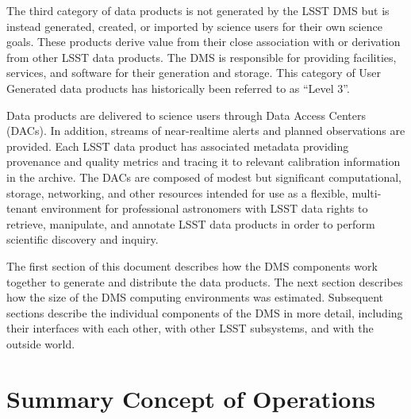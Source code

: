 \documentclass[DM,toc]{lsstdoc}
\begin{document}
The third category of data products is not generated by the LSST DMS but is
instead generated, created, or imported by science users for their own science
goals. These products derive value from their close association with or
derivation from other LSST data products. The DMS is responsible for providing
facilities, services, and software for their generation and storage.  This
category of User Generated data products has historically been referred to as ``Level 3''.

Data products are delivered to science users through Data Access
Centers (DACs). In addition, streams of near-realtime alerts and planned
observations are provided.  Each LSST data product has associated
metadata providing provenance and quality metrics and tracing it to relevant
calibration information in the archive. The DACs are composed of modest but
significant computational, storage, networking, and other resources intended
for use as a flexible, multi-tenant environment for professional astronomers
with LSST data rights to retrieve, manipulate, and annotate LSST data products
in order to perform scientific discovery and inquiry.

The first section of this document describes how the DMS components work
together to generate and distribute the data products.  The next section
describes how the size of the DMS computing environments was estimated.
Subsequent sections describe the individual components of the DMS in more
detail, including their interfaces with each other, with other LSST subsystems,
and with the outside world.

\section{Summary Concept of Operations}\label{summary-concept-of-operations}
\end{document}
